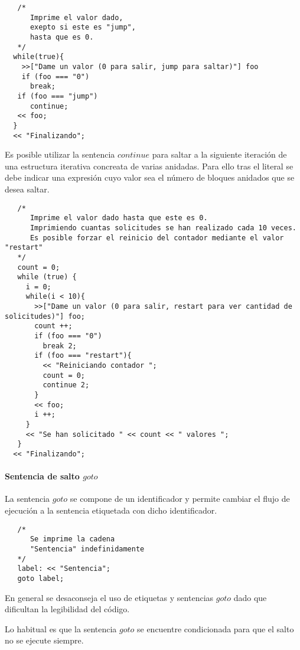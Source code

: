 \begin{lstlisting}
   /*
      Imprime el valor dado,
      exepto si este es "jump",
      hasta que es 0.
   */
  while(true){
    >>["Dame un valor (0 para salir, jump para saltar)"] foo
    if (foo === "0")
      break;
   if (foo === "jump")
      continue;
   << foo;
  }
  << "Finalizando";
\end{lstlisting}

Es posible utilizar la sentencia $continue$ para saltar a la siguiente iteración de una estructura iterativa concreata de varias anidadas. Para ello tras el literal 
se debe indicar una expresión cuyo valor sea el número de bloques anidados que se desea saltar. \\

\begin{lstlisting}
   /*
      Imprime el valor dado hasta que este es 0.
      Imprimiendo cuantas solicitudes se han realizado cada 10 veces.
      Es posible forzar el reinicio del contador mediante el valor "restart"
   */
   count = 0;
   while (true) {
     i = 0;
     while(i < 10){
       >>["Dame un valor (0 para salir, restart para ver cantidad de solicitudes)"] foo;
       count ++;
       if (foo === "0")
         break 2;
       if (foo === "restart"){
         << "Reiniciando contador ";
         count = 0;
         continue 2;
       }
       << foo;
       i ++;
     }
     << "Se han solicitado " << count << " valores ";
   }
  << "Finalizando";
\end{lstlisting} 

\paragraph{Sentencia de salto $goto$} \label{sec:stmt_goto}
La sentencia $goto$ se compone de un identificador y  permite cambiar el flujo de ejecución a la sentencia etiquetada con dicho identificador. \\

\begin{lstlisting}
   /*
      Se imprime la cadena
      "Sentencia" indefinidamente
   */
   label: << "Sentencia";
   goto label;
\end{lstlisting}

En general se desaconseja el uso de etiquetas y sentencias $goto$ dado que dificultan la legibilidad del código.

Lo habitual es que la sentencia $goto$ se encuentre condicionada para que el salto no se ejecute siempre. \\


